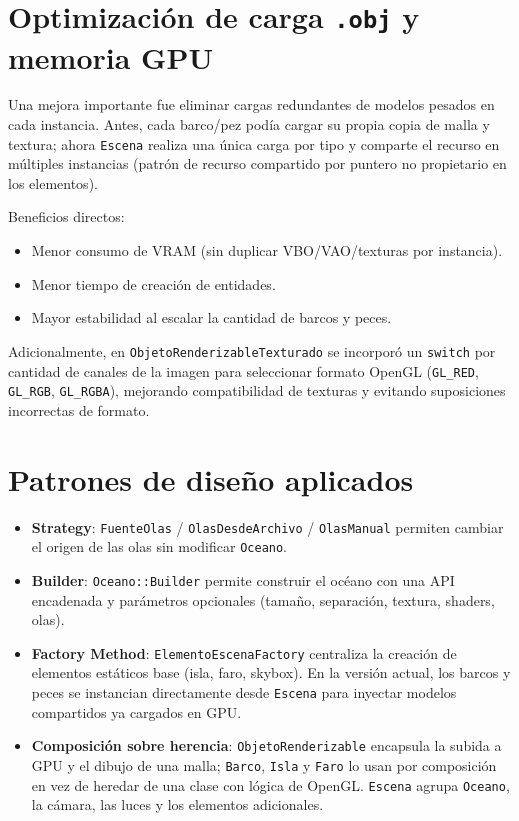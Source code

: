 \documentclass[11pt]{article}
\begin{document}
\section{Optimización de carga \texttt{.obj} y memoria GPU}
Una mejora importante fue eliminar cargas redundantes de modelos pesados en
cada instancia. Antes, cada barco/pez podía cargar su propia copia de malla y
textura; ahora \texttt{Escena} realiza una única carga por tipo y comparte el
recurso en múltiples instancias (patrón de recurso compartido por puntero no
propietario en los elementos).

Beneficios directos:
\begin{itemize}
    \item Menor consumo de VRAM (sin duplicar VBO/VAO/texturas por instancia).
    \item Menor tiempo de creación de entidades.
    \item Mayor estabilidad al escalar la cantidad de barcos y peces.
\end{itemize}

Adicionalmente, en \texttt{ObjetoRenderizableTexturado} se incorporó un
\texttt{switch} por cantidad de canales de la imagen para seleccionar formato
OpenGL (\texttt{GL\_RED}, \texttt{GL\_RGB}, \texttt{GL\_RGBA}), mejorando
compatibilidad de texturas y evitando suposiciones incorrectas de formato.

\section{Patrones de diseño aplicados}
\begin{itemize}
    \item \textbf{Strategy}: \texttt{FuenteOlas} / \texttt{OlasDesdeArchivo}
    / \texttt{OlasManual} permiten cambiar el origen de las olas sin
    modificar \texttt{Oceano}.
    \item \textbf{Builder}: \texttt{Oceano::Builder} permite construir el
    océano con una API encadenada y parámetros opcionales (tamaño,
    separación, textura, shaders, olas).
    \item \textbf{Factory Method}: \texttt{ElementoEscenaFactory} centraliza
    la creación de elementos estáticos base (isla, faro, skybox). En la
    versión actual, los barcos y peces se instancian directamente desde
    \texttt{Escena} para inyectar modelos compartidos ya cargados en GPU.
    \item \textbf{Composición sobre herencia}: \texttt{ObjetoRenderizable}
    encapsula la subida a GPU y el dibujo de una malla; \texttt{Barco},
    \texttt{Isla} y \texttt{Faro} lo usan por composición en vez de heredar
    de una clase con lógica de OpenGL. \texttt{Escena} agrupa
    \texttt{Oceano}, la cámara, las luces y los elementos adicionales.
\end{itemize}
\end{document}
